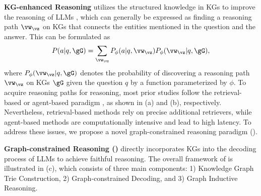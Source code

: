 \noindent\textbf{KG-enhanced Reasoning} utilizes the structured knowledge in KGs to improve the reasoning of LLMs \citep{luo2024rog,sunthink}, which can generally be expressed as finding a reasoning path $\vw_\vz$ on KGs that connects the entities mentioned in the question and the answer. This can be formulated as
\begin{equation}
    P(a|q,\gG)=\sum_{\vw_\vz}P_\phi(a|q, \vw_\vz)P_{\phi}(\vw_\vz|q,\gG),\label{eq:kgqa}
\end{equation}
where $P_{\phi}(\vw_\vz|q,\gG)$ denotes the probability of discovering a reasoning path $\vw_\vz$ on KGs $\gG$ given the question $q$ by a function parameterized by $\phi$. To acquire reasoning paths for reasoning, most prior studies follow the retrieval-based \citep{li2023graph} or agent-based paradigm \citep{sunthink}, as shown in  (a) and (b), respectively. Nevertheless, retrieval-based methods rely on precise additional retrievers, while agent-based methods are computationally intensive and lead to high latency. To address these issues, we propose a novel graph-constrained reasoning paradigm (\ourmethod).




\noindent\textbf{Graph-constrained Reasoning (\ourmethod)} directly incorporates KGs into the decoding process of LLMs to achieve faithful reasoning. 
%
The overall framework of \ourmethod is illustrated in  (c), which consists of three main components: 1) Knowledge Graph Trie Construction, 2) Graph-constrained Decoding, and 3) Graph Inductive Reasoning.

